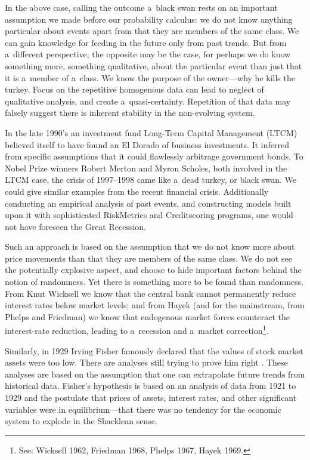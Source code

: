 In the above case, calling the outcome a~black swan rests on an important assumption we made before our probability calculus: we do not know anything particular about events apart from that they are members of the same class. We can gain knowledge for feeding in the future only from past trends. But from a~different perspective, the opposite may be the case, for perhaps we do know something more, something qualitative, about the particular event than just that it is a~member of a~class. We know the purpose of the owner---why he kills the turkey. Focus on the repetitive homogenous data can lead to neglect of qualitative analysis, and create a~quasi-certainty. Repetition of that data may falsely suggest there is inherent stability in the non-evolving system.



In the late 1990's an investment fund Long-Term Capital Management (LTCM) believed itself to have found an El Dorado of business investments. It inferred from specific assumptions that it could flawlessly arbitrage government bonds. To Nobel Prize winners Robert Merton and Myron Scholes, both involved in the LTCM case, the crisis of 1997–1998 came like a~dead turkey, or black swan. We could give similar examples from the recent financial crisis. Additionally conducting an empirical analysis of past events, and constructing models built upon it with sophisticated RiskMetrics and Creditscoring programs, one would not have foreseen the Great Recession.



Such an approach is based on the assumption that we do not know more about price movements than that they are members of the same class. We do not see the potentially explosive aspect, and choose to hide important factors behind the notion of randomness. Yet there is something more to be found than randomness. From Knut Wicksell we know that the central bank cannot permanently reduce interest rates below market levels; and from Hayek (and for the mainstream, from Phelps and Friedman) we know that endogenous market forces counteract the interest-rate reduction, leading to a~recession and a~market correction\footnote{See: Wicksell 1962, Friedman 1968, Phelps 1967, Hayek 1969.}.



Similarly, in 1929 Irving Fisher famously declared that the values of stock market assets were too low. There are analyses still trying to prove him right 
\parencite[see, for example,][]{mcgrattan_1929_2003}. %
 These analyses are based on the assumption that one can extrapolate future trends from historical data. Fisher's hypothesis is based on an analysis of data from 1921 to 1929 and the postulate that prices of assets, interest rates, and other significant variables were in equilibrium---that there was no tendency for the economic system to explode in the Shacklean sense.



